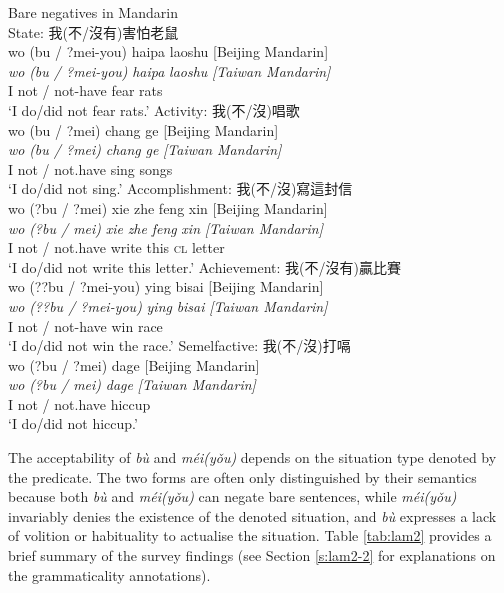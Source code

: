 \documentclass[output=paper]{langscibook}
\begin{document}
\ea Bare negatives in Mandarin \label{ex:lam12}\\
  \ea State: 我(不/沒有)害怕老鼠 \label{ex:lam12a}\\
  	\glll wo	{(bu / ?mei-you)}	haipa	laoshu	{[Beijing Mandarin]}\\
	\textit{wo} \textit{(bu / ?mei-you)}	\textit{haipa} \textit{laoshu} \textit{[Taiwan Mandarin]}\\
	I {not / not-have} fear rats\\
	\glt `I do/did not fear rats.'
  \ex Activity: 我(不/沒)唱歌 \label{ex:lam12b}\\
  	\glll wo	{(bu / ?mei)}	chang	ge	{[Beijing Mandarin]}\\
	  \textit{wo}	\textit{(bu / ?mei)} \textit{chang} \textit{ge} \textit{[Taiwan Mandarin]}\\
	I {not / not.have} sing songs\\
	\glt `I do/did not sing.'
  \ex Accomplishment: 我(不/沒)寫這封信 \label{ex:lam12c}\\
	\glll wo	 {(?bu / ?mei)} xie zhe feng xin {[Beijing Mandarin]}\\
	\textit{wo} \textit{(?bu / mei)} \textit{xie} \textit{zhe} \textit{feng} \textit{xin} \textit{[Taiwan Mandarin]}\\
	I {not / not.have} write this \textsc{cl} letter\\
	\glt `I do/did not write this letter.'
  \ex Achievement: 我(不/沒有)贏比賽 \label{ex:lam12d}\\
  	\glll wo	 {(??bu / ?mei-you)} ying bisai {[Beijing Mandarin]}\\
  	\textit{wo} \textit{(??bu / ?mei-you)} \textit{ying} \textit{bisai} \textit{[Taiwan Mandarin]}\\
  	I {not / not-have} win race\\
  	\glt `I do/did not win the race.'
  \ex Semelfactive: 我(不/沒)打嗝 \label{ex:lam12e}\\
	\glll wo {(?bu / ?mei)} dage {[Beijing Mandarin]}\\
	\textit{wo} \textit{(?bu / mei)} \textit{dage} \textit{[Taiwan Mandarin]}\\
	I {not / not.have} hiccup\\
	\glt `I do/did not hiccup.'
\z \z 

The acceptability of \textit{bù} and \textit{méi(yǒu)} depends on the situation type denoted by the predicate. The two forms are often only distinguished by their semantics because both \textit{bù} and \textit{méi(yǒu)} can negate bare sentences, while \textit{méi(yǒu)} invariably denies the existence of the denoted situation, and \textit{bù} expresses a lack of volition or habituality to actualise the situation. Table \ref{tab:lam2} provides a brief summary of the survey findings (see Section \ref{s:lam2-2} for explanations on the grammaticality annotations).
\end{document}
